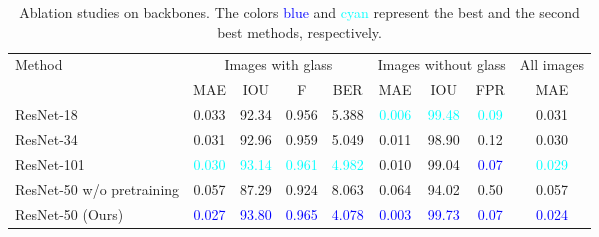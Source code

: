 \begin{table*}[ht]
\renewcommand\arraystretch{1.5}
\setlength\tabcolsep{5pt}
\centering
\caption{Ablation studies on backbones. The colors \textcolor{blue}{blue} and \textcolor{cyan}{cyan} represent the best and the second best methods, respectively.} 
\label{tab:ab_backbone}
\begin{tabular}{lcccccccc} 
\toprule
\multirow{2}{*}{Method} & \multicolumn{4}{c}{Images with glass} & \multicolumn{3}{c}{Images without glass} & All images        \\ 
\cmidrule[0.25pt](lr){2-5} \cmidrule[0.25pt](lr){6-8} \cmidrule[0.25pt](lr){9-9} 
& MAE                       & IOU                         & F                     & BER                       & MAE                       & IOU                    & FPR                      & MAE   \\ 
\midrule
ResNet-18  & 0.033 & 92.34 & 0.956 & 5.388 & \textcolor{cyan}{0.006} & \textcolor{cyan}{99.48} & \textcolor{cyan}{0.09} & 0.031\\
ResNet-34 & 0.031 & 92.96 & 0.959 & 5.049 & 0.011 & 98.90 & 0.12 & 0.030\\
ResNet-101 & \multicolumn{1}{c}{\textcolor{cyan}{0.030}} & \multicolumn{1}{c}{\textcolor{cyan}{93.14}} & \multicolumn{1}{c}{\textcolor{cyan}{0.961}} & \textcolor{cyan}{4.982} & \multicolumn{1}{c}{0.010} & \multicolumn{1}{c}{99.04} & \textcolor{blue}{0.07} & \textcolor{cyan}{0.029}\\
ResNet-50 w/o pretraining  & \multicolumn{1}{c}{0.057} & \multicolumn{1}{c}{87.29} & \multicolumn{1}{c}{0.924} & 8.063 & \multicolumn{1}{c}{0.064} & \multicolumn{1}{c}{94.02} & 0.50 & 0.057\\ \hline
ResNet-50 (Ours) & \multicolumn{1}{c}{\textcolor{blue}{0.027}} & \multicolumn{1}{c}{\textcolor{blue}{93.80}} & \multicolumn{1}{c}{\textcolor{blue}{0.965}} & \textcolor{blue}{4.078} & \multicolumn{1}{c}{\textcolor{blue}{0.003}} & \multicolumn{1}{c}{\textcolor{blue}{99.73}} & \textcolor{blue}{0.07} &\textcolor{blue}{0.024}\\
\bottomrule
\end{tabular}
\end{table*}

